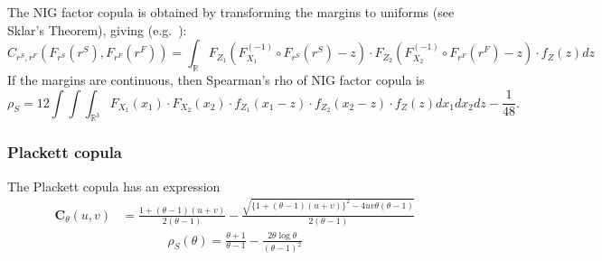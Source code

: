 The NIG factor copula is obtained by transforming the margins to
uniforms (see Sklar's Theorem), giving (e.g.\
\citep{krupskii2013factor}):
\begin{equation*}
  C_{r^S, r^F}(F_{r^S}(r^S), F_{r^F}(r^F)) = \int_\mathbb{R}
  F_{Z_1}(F_{X_1}^{(-1)} \circ F_{r^S}(r^S) -z) \cdot
  F_{Z_2}(F_{X_2}^{(-1)} \circ F_{r^F}(r^F) -z) \cdot
  f_Z(z) dz
  \end{equation*}
If the margins are continuous, then Spearman's rho of NIG factor
copula is 
\begin{equation*}
  \rho_S = 12 \int \int \int_{\mathbb{R}^3}
  F_{X_1}(x_1) \cdot
  F_{X_2}(x_2) \cdot
  f_{Z_1}(x_1-z) \cdot
  f_{Z_2}(x_2-z) \cdot
  f_Z(z) dx_1 dx_2 dz - \frac{1}{48}.
  \end{equation*}



\subsubsection{Plackett copula}\label{subsec:other-copula}
The Plackett copula has an expression
\begin{align}
    \bm{C}_{\theta}(u,v) &= \frac{1+(\theta-1)(u+v)}{2(\theta-1)}
                         - \frac{\sqrt{\{
    1+(\theta-1)(u+v)\}^2 - 4uv\theta(\theta-1)}}{2(\theta-1)}
    \end{align}
\begin{align}
    \rho_S(\theta) = \frac{\theta+1}{\theta-1} - \frac{2\theta \log \theta}{(\theta-1)^2}
    \end{align}\medskip

